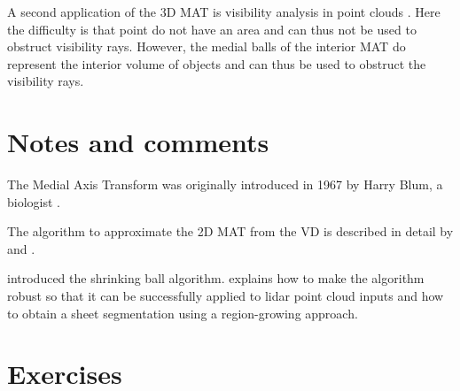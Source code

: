 A second application of the 3D MAT is visibility analysis in point clouds \citep{Peters15}.
Here the difficulty is that point do not have an area and can thus not be used to obstruct visibility rays.
However, the medial balls of the interior MAT do represent the interior volume of objects and can thus be used to obstruct the visibility rays.


\section{Notes and comments}
The Medial Axis Transform was originally introduced in 1967 by Harry Blum, a biologist \citep{Blum67}.

The algorithm to approximate the 2D MAT from the VD is described in detail by \citet{Gold99} and \citet{Gold01}.

\citet{Ma12} introduced the shrinking ball algorithm. \citet{Peters18} explains how to make the algorithm robust so that it can be successfully applied to lidar point cloud inputs and how to obtain a sheet segmentation using a region-growing approach.

%
\section{Exercises}


